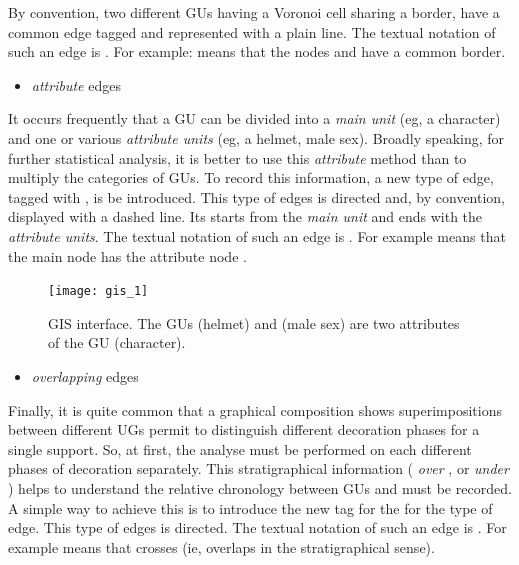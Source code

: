 \documentclass[article]{jss}\usepackage{knitr}
\begin{document}
By convention, two different GUs having a Voronoi cell sharing a border, have a common edge tagged  and represented with a plain line. The textual notation of such an edge is . For example:  means that the nodes  and  have a common border.

\begin{itemize}
  \item \emph{attribute} edges
\end{itemize}

It occurs frequently that a GU can be divided into a \emph{main unit} (eg, a character) and one or various \emph{attribute units} (eg, a helmet, male sex). Broadly speaking, for further statistical analysis, it is better to use this \emph{attribute} method than to multiply the categories of GUs. To record this information, a new type of edge, tagged with , is be introduced. This type of edges is directed and, by convention, displayed with a dashed line. Its starts from the \emph{main unit} and ends with the \emph{attribute units}. The textual notation of such an edge is . For example  means that the main node  has the attribute node .

\begin{figure}[H] 
\centering
\texttt{[image: gis\_1]}
\caption{\label{fig:gis1} GIS interface. The GUs  (helmet) and  (male sex) are two attributes of the GU  (character).}
\end{figure}

\begin{itemize}
  \item \emph{overlapping} edges
\end{itemize}

Finally, it is quite common that a graphical composition shows superimpositions between different UGs permit to distinguish different decoration phases for a single support. So, at first, the analyse must be performed on each different phases of decoration separately. This stratigraphical information ( \emph{over} , or  \emph{under} ) helps to understand the relative chronology between GUs and must be recorded. A simple way to achieve this is to introduce the new tag  for the for the type of edge. This type of edges is directed. The textual notation of such an edge is . For example  means that  crosses  (ie,  overlaps  in the stratigraphical sense).
\end{document}
